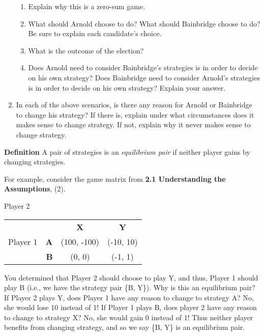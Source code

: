\begin{enumerate}
\vspace{.1in}

\begin{enumerate}
\item Explain why this is a zero-sum game.

\item What should Arnold choose to do? What should Bainbridge choose to do? Be sure to explain each candidate's choice.

\item What is the outcome of the election?
\item Does Arnold need to consider Bainbridge's strategies is in order to decide on his own strategy? Does Bainbridge need to consider Arnold's strategies is in order to decide on his own strategy? Explain your answer.

\end{enumerate}

\vspace{.1in}

\item In each of the above scenarios, is there any reason for Arnold or Bainbridge to change his strategy? If there is, explain under what circumstances does it makes sense to change strategy. If not, explain why it never makes sense to change strategy.

\end{enumerate}

\vspace{.2in}

\textbf{Definition} A pair of strategies is an {\it equilibrium pair} if neither player gains by changing strategies.

For example, consider the game matrix from {\bf 2.1 Understanding the Assumptions}, (2).

\hspace{1.2in}Player 2

\begin{tabular}{l|r|c|c|}\cline{2-4}
&&\textbf{X}&\textbf{Y}\\ \cline{2-4}
Player 1&\textbf{A} &(100, -100)&(-10, 10)\\ \cline{2-4}
&\textbf{B} &(0, 0)&(-1, 1)\\ \cline{2-4}

\end{tabular}

\vspace{.1in}

You determined that Player 2 should choose to play Y, and thus, Player 1 should play B (i.e., we have the strategy pair \{B, Y\}). Why is this an equilibrium pair? If Player 2 plays Y, does Player 1 have any reason to change to strategy A? No, she would lose 10 instead of 1! If Player 1 plays B, does player 2 have any reason to change to strategy X? No, she would gain 0 instead of 1! Thus neither player benefits from changing strategy, and so we say \{B, Y\} is an equilibrium pair. 

